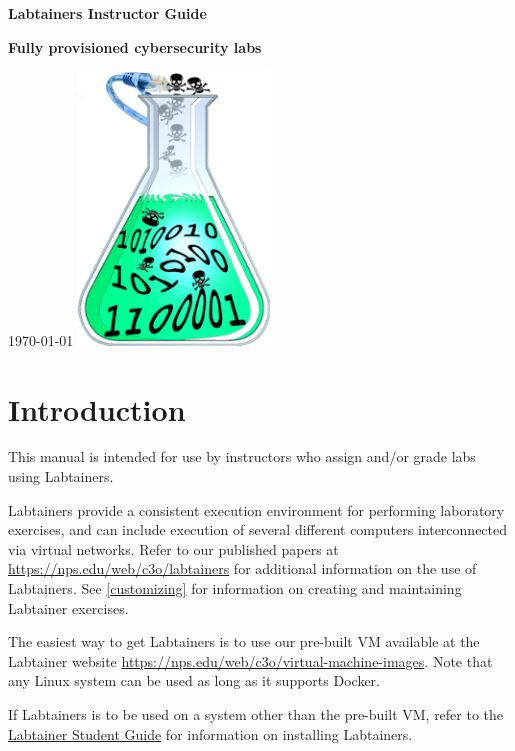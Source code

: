 \documentclass[12pt]{article}
\begin{document}
\begin{titlepage}
\centering
\vfill
\vspace*{4\baselineskip}
{\bfseries\Large
Labtainers Instructor Guide\par
}
\vspace*{4\baselineskip}
{\bfseries
Fully provisioned cybersecurity labs\par
}
\vspace*{2\baselineskip}
\today
\vfill
\includegraphics[width=2in]{labtainer5-sm.png}
\vfill
\end{titlepage}

\section {Introduction}
This manual is intended for use by instructors who assign and/or grade
labs using Labtainers.

Labtainers provide a consistent execution environment for performing
laboratory exercises, and can include execution of several different
computers interconnected via virtual networks.  Refer to our published
papers at \url{https://nps.edu/web/c3o/labtainers} for additional information
on the use of Labtainers.  
See \ref{customizing} for information on creating and maintaining Labtainer exercises.

The easiest way to get Labtainers is to use our pre-built VM available at the Labtainer
website \url{https://nps.edu/web/c3o/virtual-machine-images}.
Note that any Linux system can be used as long as it supports Docker.

If Labtainers is to be used on a system other than the pre-built VM,
refer to the \underline{Labtainer Student Guide} for information on
installing Labtainers.
\end{document}
